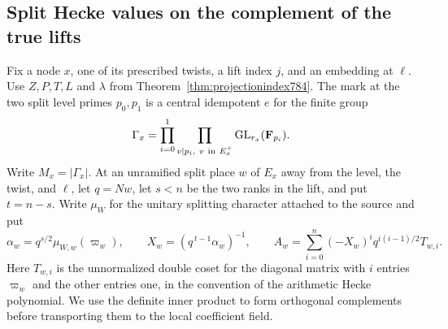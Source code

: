 \documentclass[a4paper,11pt]{article}
\theoremstyle{definition}
\theoremstyle{remark}
\numberwithin{equation}{section}
\begin{document}
\subsection{Split Hecke values on the complement of the true lifts}
\label{sec:splitcost785}
Fix a node \(x\), one of its prescribed twists, a lift index
\(j\), and an embedding at \(\ell\). Use \(Z,P,T,L\) and
\(\lambda\) from Theorem~\ref{thm:projectionindex784}.
The mark at the two split level primes \(p_0,p_1\) is a
central idempotent \(e\) for the finite group
\[
  \Gamma_x=\prod_{i=0}^1\prod_{v\mid p_i,\ v\ {\rm in}\ E_x^+}
                     {\rm GL}_{r_x}(\mathbf F_{p_i}).
\]
Write \(M_x=|\Gamma_x|\). At an unramified split place \(w\)
of \(E_x\) away from the level, the twist, and \(\ell\), let
\(q=Nw\), let \(s<n\) be the two ranks in the lift, and put
\(t=n-s\). Write \(\mu_W\) for the unitary splitting character
attached to the source and put
\[
   \alpha_w=q^{s/2}\mu_{W,w}(\varpi_w),\qquad
   X_w=(q^{\,t-1}\alpha_w)^{-1},\qquad
   A_w=\sum_{i=0}^{n}(-X_w)^i q^{i(i-1)/2}T_{w,i}.
\]
Here \(T_{w,i}\) is the unnormalized double coset for the
diagonal matrix with \(i\) entries \(\varpi_w\) and the
other entries one, in the convention of the arithmetic
Hecke polynomial. We use the definite inner product to
form orthogonal complements before transporting them to
the local coefficient field.
\end{document}
